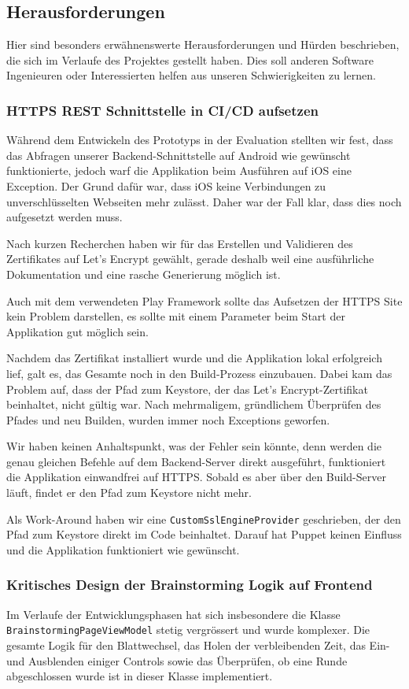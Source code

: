 \subsection{Herausforderungen}
Hier sind besonders erwähnenswerte Herausforderungen und Hürden beschrieben, die sich im Verlaufe des Projektes gestellt haben. Dies soll anderen Software Ingenieuren oder Interessierten helfen  aus unseren Schwierigkeiten zu lernen. 

\subsubsection{HTTPS REST Schnittstelle in CI/CD aufsetzen}
Während dem Entwickeln des Prototyps in der Evaluation stellten wir fest, dass das Abfragen unserer Backend-Schnittstelle auf Android wie gewünscht funktionierte, jedoch warf die Applikation beim Ausführen auf iOS eine Exception. Der Grund dafür war, dass iOS keine Verbindungen zu unverschlüsselten Webseiten mehr zulässt. Daher war der Fall klar, dass dies noch aufgesetzt werden muss.

Nach kurzen Recherchen haben wir für das Erstellen und Validieren des Zertifikates auf Let's Encrypt \cite{letsencrypt} gewählt, gerade deshalb weil eine ausführliche Dokumentation und eine rasche Generierung möglich ist. 

Auch mit dem verwendeten Play Framework sollte das Aufsetzen der HTTPS Site kein Problem darstellen, es sollte mit einem Parameter beim Start der Applikation gut möglich sein. 

Nachdem das Zertifikat installiert wurde und die Applikation lokal erfolgreich lief, galt es, das Gesamte noch in den Build-Prozess einzubauen. Dabei kam das Problem auf, dass der Pfad zum Keystore, der das Let's Encrypt-Zertifikat beinhaltet, nicht gültig war. Nach mehrmaligem, gründlichem Überprüfen des Pfades und neu Builden, wurden immer noch Exceptions geworfen.

Wir haben keinen Anhaltspunkt, was der Fehler sein könnte, denn werden die genau gleichen Befehle auf dem Backend-Server direkt ausgeführt, funktioniert die Applikation einwandfrei auf HTTPS. Sobald es aber über den Build-Server läuft, findet er den Pfad zum Keystore nicht mehr.

Als Work-Around haben wir eine \texttt{CustomSslEngineProvider} geschrieben, der den Pfad zum Keystore direkt im Code beinhaltet. Darauf hat Puppet keinen Einfluss und die Applikation funktioniert wie gewünscht.

\subsubsection{Kritisches Design der Brainstorming Logik auf Frontend}
Im Verlaufe der Entwicklungsphasen hat sich insbesondere die Klasse \texttt{Brain\-storming\-PageViewModel} stetig vergrössert und wurde komplexer. Die gesamte Logik für den Blattwechsel, das Holen der verbleibenden Zeit, das Ein- und Ausblenden einiger Controls sowie das Überprüfen, ob eine Runde abgeschlossen wurde ist in dieser Klasse implementiert. 


